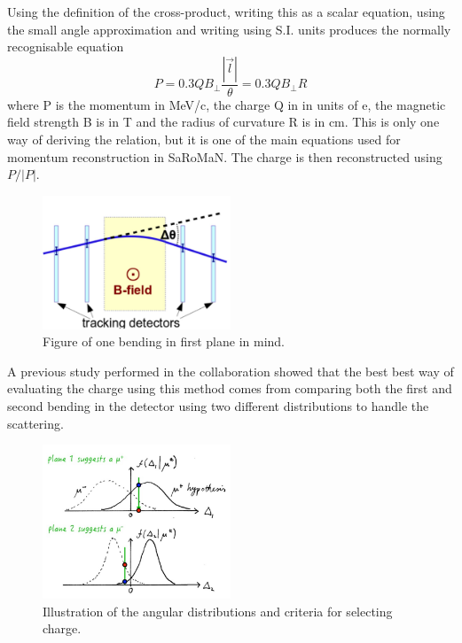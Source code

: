 Using the definition of the cross-product, writing this as a scalar equation, using the small angle approximation and writing using S.I. units produces the normally recognisable equation
\begin{equation}
P = 0.3 QB_\bot \frac{|\vec{l}|}{\theta}=0.3 QB_\bot R
\end{equation}
where P is the momentum in MeV/c, the charge Q in in units of e, the magnetic field strength B is in T and the radius of curvature R is in cm. This is only one way of deriving the relation, but it is one of the main equations used for momentum reconstruction in SaRoMaN. The charge is then reconstructed using $P/|P|$. 

\begin{figure}[h!]
\centering
\includegraphics[width=0.5\textwidth]{figures/lowP/scattering.jpeg}
\caption{Figure of one bending in first plane in mind.}
\label{fig:Scattering}
\end{figure}

A previous study performed in the collaboration showed that the best best way of evaluating the charge using this method comes from comparing both the first and second bending in the detector using two different distributions to handle the scattering.

\begin{figure}[h!]
\centering
\includegraphics[width=0.5\textwidth]{figures/lowP/null.jpg}
\caption{Illustration of the angular distributions and criteria for selecting charge.}
\label{fig:NullHyp}
\end{figure}

